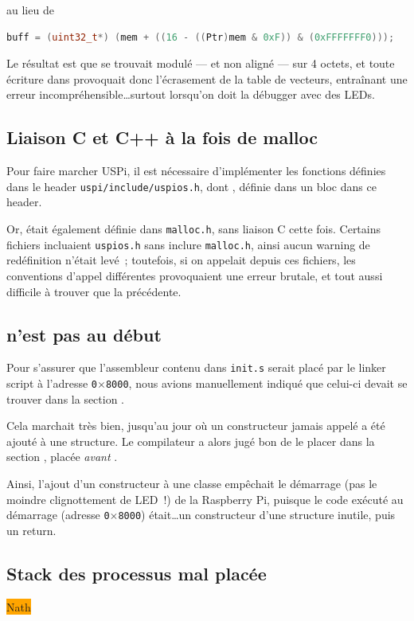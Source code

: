 \documentclass[11pt,a4paper]{article}
\newcommand{\hex}[1]{\texttt{0$\times$#1}}
\newcommand{\fname}[1]{\texttt{#1}} %
\newcommand{\todo}[1]{\colorbox{orange}{\color{blue}{\Large TODO:} #1}}
\begin{document}
au lieu de
\begin{lstlisting}[language=C++]
buff = (uint32_t*) (mem + ((16 - ((Ptr)mem & 0xF)) & (0xFFFFFFF0)));
\end{lstlisting}

Le résultat est que  se trouvait modulé --- et non aligné --- sur 4
octets, et toute écriture dans  provoquait donc l'écrasement de la
table de vecteurs, entraînant une erreur incompréhensible\ldots surtout
lorsqu'on doit la débugger avec des LEDs.


\subsection*{Liaison C et C++ à la fois de malloc}
Pour faire marcher USPi, il est nécessaire d'implémenter les fonctions
définies dans le header \fname{uspi/include/uspios.h}, dont ,
définie dans un bloc  dans ce header. %

Or,  était également définie dans \fname{malloc.h}, sans liaison
C cette fois. Certains fichiers incluaient \fname{uspios.h} sans inclure
\fname{malloc.h}, ainsi aucun warning de redéfinition n'était levé~; toutefois,
si on appelait  depuis ces fichiers, les conventions d'appel
différentes provoquaient une erreur brutale, et tout aussi difficile à
trouver que la précédente.

\subsection*{ n'est pas au début}
Pour s'assurer que l'assembleur contenu dans \fname{init.s} serait placé par
le linker script à l'adresse \hex{8000}, nous avions manuellement indiqué
que celui-ci devait se trouver dans la section .

Cela marchait très bien, jusqu'au jour où un constructeur jamais appelé a été
ajouté à une structure. Le compilateur a alors jugé bon de le placer dans
la section , placée \emph{avant} .

Ainsi, l'ajout d'un constructeur à une classe empêchait le démarrage
(pas le moindre clignottement de LED~!) de la Raspberry Pi, puisque le code
exécuté au démarrage (adresse \hex{8000}) était\ldots un constructeur d'une
structure inutile, puis un return.

\subsection*{Stack des processus mal placée}
\todo{Nath}
\end{document}
